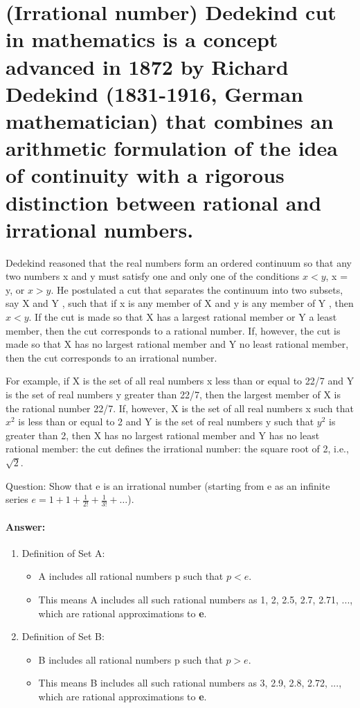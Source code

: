 \documentclass{article}
\begin{document}
\section{(Irrational number) Dedekind cut in mathematics is a concept advanced in 1872 by Richard Dedekind (1831-1916, German mathematician) that combines an arithmetic formulation of the idea of continuity with a rigorous distinction between rational and irrational numbers. }

Dedekind reasoned that the real numbers form an ordered continuum so that any two numbers x and y must satisfy one and only one of the conditions $x < y$, x = y, or $x > y$. He postulated a cut that separates the continuum into two subsets, say X and Y , such that if x is any member of X and y is any member of Y , then $x < y$. If the cut is made so that X has a largest rational member or Y a least member, then the cut corresponds to a rational number. If, however, the cut is made so that X has no largest rational member and Y no least rational member, then the cut corresponds to an irrational number.

For example, if X is the set of all real numbers x less than or equal to 22/7 and Y is the set of real numbers y greater than 22/7, then the largest member of X is the rational number 22/7. If, however, X is the set of all real numbers x such that $x^2$ is less than or equal to 2 and Y is the set of real numbers y such that $y^2$ is greater than 2, then X has no largest rational member and Y has no least rational member: the cut defines the irrational number: the square root of 2, i.e., $\sqrt{2}$.
\begin{tcolorbox}
  Question: Show that e is an irrational number (starting from e as an infinite series $e = 1+1+ \frac{1}{2!}  + \frac{1}{3!} +\ldots $).
\end{tcolorbox}


\paragraph{Answer:}
\begin{enumerate}
  \item Definition of Set A:
  \begin{itemize}
    \item A includes all rational numbers p such that $p < e$.
    \item This means A includes all such rational numbers as 1, 2, 2.5, 2.7, 2.71, ..., which are rational approximations to \textbf{e}.
  \end{itemize}
  \item Definition of Set B:
  \begin{itemize}
    \item B includes all rational numbers p such that $p > e$.
    \item This means B includes all such rational numbers as 3, 2.9, 2.8, 2.72, ..., which are rational approximations to \textbf{e}.
  \end{itemize}
\end{enumerate}
\end{document}
